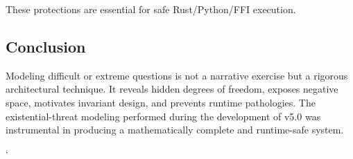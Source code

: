 These protections are essential for safe Rust/Python/FFI execution.

\subsection*{Conclusion}

Modeling difficult or extreme questions is not a narrative exercise but a
rigorous architectural technique. It reveals hidden degrees of freedom, exposes
negative space, motivates invariant design, and prevents runtime pathologies.
The existential-threat modeling performed during the development of v5.0 was
instrumental in producing a mathematically complete and runtime-safe system.

`
